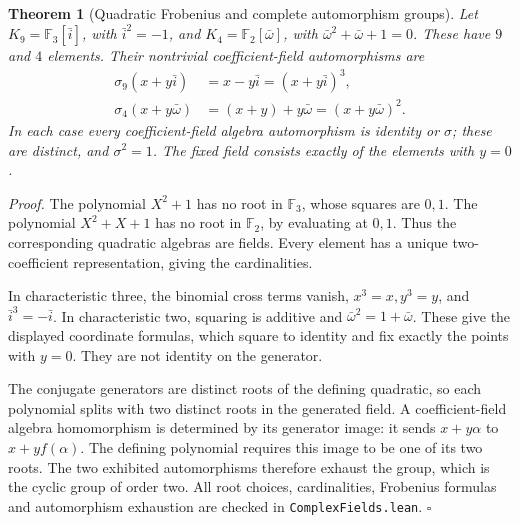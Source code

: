 \documentclass[11pt,letterpaper]{article}
\newtheorem{theorem}{Theorem}
\newenvironment{proof}{\noindent\textit{Proof.}}{\hfill\(\square\)}
\begin{document}
\begin{theorem}[Quadratic Frobenius and complete automorphism groups]
Let \(K_9=\mathbb F_3[\bar i]\), with \(\bar i^2=-1\), and \(K_4=\mathbb F_2[\bar\omega]\), with \(\bar\omega^2+\bar\omega+1=0\). These have \(9\) and \(4\) elements. Their nontrivial coefficient-field automorphisms are
\begin{align*}
\sigma_9(x+y\bar i)&=x-y\bar i=(x+y\bar i)^3,\\
\sigma_4(x+y\bar\omega)&=(x+y)+y\bar\omega=(x+y\bar\omega)^2.
\end{align*}
In each case every coefficient-field algebra automorphism is identity or \(\sigma\); these are distinct, and \(\sigma^2=1\). The fixed field consists exactly of the elements with \(y=0\).
\end{theorem}
\begin{proof}
The polynomial \(X^2+1\) has no root in \(\mathbb F_3\), whose squares are \(0,1\). The polynomial \(X^2+X+1\) has no root in \(\mathbb F_2\), by evaluating at \(0,1\). Thus the corresponding quadratic algebras are fields. Every element has a unique two-coefficient representation, giving the cardinalities.

In characteristic three, the binomial cross terms vanish, \(x^3=x,y^3=y\), and \(\bar i^3=-\bar i\). In characteristic two, squaring is additive and \(\bar\omega^2=1+\bar\omega\). These give the displayed coordinate formulas, which square to identity and fix exactly the points with \(y=0\). They are not identity on the generator.

The conjugate generators are distinct roots of the defining quadratic, so each polynomial splits with two distinct roots in the generated field. A coefficient-field algebra homomorphism is determined by its generator image: it sends \(x+y\alpha\) to \(x+yf(\alpha)\). The defining polynomial requires this image to be one of its two roots. The two exhibited automorphisms therefore exhaust the group, which is the cyclic group of order two. All root choices, cardinalities, Frobenius formulas and automorphism exhaustion are checked in \texttt{ComplexFields.lean}.
\end{proof}
\end{document}
